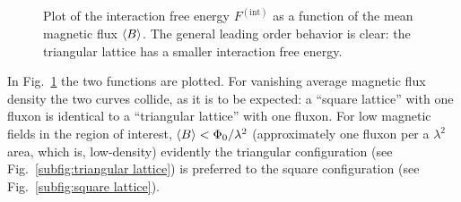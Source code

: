 \begin{figure}
	\centering
	
	\caption{Plot of the interaction free energy $F^{(\mathrm{int})}$ as a function of the mean magnetic flux $\ev{B}$. The general leading order behavior is clear: the triangular lattice has a smaller interaction free energy.}
	\label{fig:interaction free energy square versus triangular}
\end{figure}

In Fig.~\ref{fig:interaction free energy square versus triangular} the two functions are plotted. For vanishing average magnetic flux density the two curves collide, as it is to be expected: a ``square lattice'' with one fluxon is identical to a ``triangular lattice'' with one fluxon. For low magnetic fields in the region of interest, $\ev{B} < \Phi_0/\lambda^2$ (approximately one fluxon per a $\lambda^2$ area, which is, low-density) evidently the triangular configuration (see Fig.~\ref{subfig:triangular lattice}) is preferred to the square configuration (see Fig.~\ref{subfig:square lattice}).